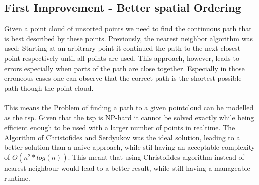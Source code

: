 \subsection{First Improvement - Better spatial Ordering}
Given a point cloud of unsorted points we need to find the continuous path that is best described by these points. Previously, the nearest neighbor algorithm was used: Starting at an arbitrary point it continued the path to the next closest point respectively until all points are used. This approach, however, leads to errors especially when parts of the path are close together. Especially in those erroneous cases one can observe that the correct path is the shortest possible path though the point cloud. \\\\
 This means the Problem of finding a path to a given pointcloud can be modelled as the \ac{tsp}. Given that the \ac{tsp} is NP-hard\cite{Korte2008} it cannot be solved exactly while being efficient enough to be used with a larger number of points in realtime. The Algorithm of Christofides and Serdyukov was the ideal solution, leading to a better solution than a naive approach, while stil having an acceptable complexity of $O(n^2 * log(n))$\cite{Christofides2022}. This meant that using Christofides algorithm instead of nearest neighbour would lead to a better result, while still having a manageable runtime. 

